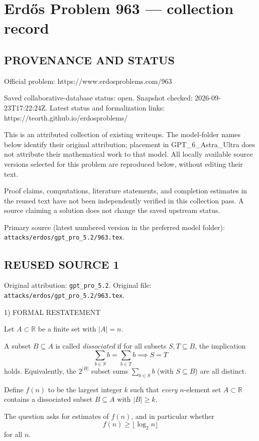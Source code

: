\section*{Erd\H{o}s Problem 963 --- collection record}

\subsection*{PROVENANCE AND STATUS}
Official problem: https://www.erdosproblems.com/963

Saved collaborative-database status: open.
Snapshot checked: 2026-09-23T17:22:24Z.
Latest status and formalization links: https://teorth.github.io/erdosproblems/

This is an attributed collection of existing writeups. The model-folder names below identify their original attribution; placement in GPT\_6\_Astra\_Ultra does not attribute their mathematical work to that model. All locally available source versions selected for this problem are reproduced below, without editing their text.

Proof claims, computations, literature statements, and completion estimates in the reused text have not been independently verified in this collection pass. A source claiming a solution does not change the saved upstream status.

Primary source (latest numbered version in the preferred model folder): \texttt{attacks/erdos/gpt\_pro\_5.2/963.tex}.

\subsection*{REUSED SOURCE 1}
Original attribution: \texttt{gpt\_pro\_5.2}.
Original file: \texttt{attacks/erdos/gpt\_pro\_5.2/963.tex}.


1) FORMAL RESTATEMENT

Let $A\subset\mathbb R$ be a finite set with $|A|=n$.

A subset $B\subseteq A$ is called \emph{dissociated} if for all subsets $S,T\subseteq B$, the implication
\[
\sum_{b\in S} b = \sum_{b\in T} b \implies S=T
\]
holds. Equivalently, the $2^{|B|}$ subset sums $\sum_{b\in S} b$ (with $S\subseteq B$) are all distinct.

Define $f(n)$ to be the largest integer $k$ such that \emph{every} $n$-element set $A\subset\mathbb R$ contains a dissociated subset $B\subseteq A$ with $|B|\ge k$.

The question asks for estimates of $f(n)$, and in particular whether
\[
 f(n)\ge \lfloor \log_2 n\rfloor
\]
for all $n$.

